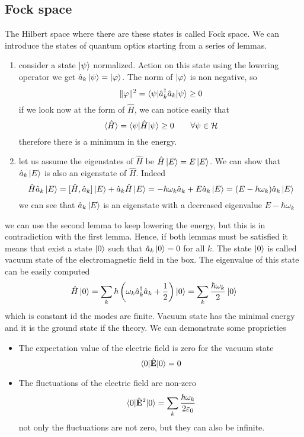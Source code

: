 \documentclass[12pt]{article}
\theoremstyle{plain}
\renewcommand{\H}{\mathcal{H}}
\theoremstyle{definition}
\theoremstyle{remark}
\begin{document}
\subsection{Fock space}
The Hilbert space where there are these states is called Fock space. We can introduce the states of quantum optics starting from a series of lemmas.
\begin{enumerate}
	\item consider a state $\ket{\psi}$ normalized. Action on this state using the lowering operator we get $\hat{a}_k \ket{\psi} = \ket{\varphi}$. The norm of $\ket{\varphi}$ is non negative, so
	\[ \|\varphi\|^2 = \braket{\psi |\hat{a}^\dagger_k \hat{a}_k|\psi}\ge 0\]
	if we look now at the form of $\hat{H}$, we can notice easily that
	\[\braket{\hat{H}} = \braket{\psi|\hat{H}|\psi} \ge 0 \qquad \forall \psi \in \H\]
	therefore there is a minimum in the energy.
	\item let us assume the eigenstates of $\hat{H}$ be $\hat{H}\ket{E} = E \ket{E}$. We can show that $\hat{a}_k\ket{E}$ is also an eigenstate of $\hat{H}$. Indeed
	\[\hat{H} \hat{a}_k \ket{E} = [\hat{H},\hat{a}_k]\ket{E} +\hat{a}_k \hat{H} \ket{E} = -\hbar \omega_k \hat{a}_k + E \hat{a}_k \ket{E} = (E-\hbar \omega_k)\hat{a}_k\ket{E}\]
	we can see that $\hat{a}_k\ket{E}$ is an eigenstate with a decreased eigenvalue $E-\hbar\omega_k$
\end{enumerate}
we can use the second lemma to keep lowering the energy, but this is in contradiction with the first lemma. Hence, if both lemmas must be satisfied it means that exist a state $\ket{0}$ such that $\hat{a}_k \ket{0} = 0$ for all $k$. The state $\ket{0}$ is called vacuum state of the electromagnetic field in the box. The eigenvalue of this state can be easily computed
\[\hat{H}\ket{0} = \sum_k \hbar \left(\omega_k\hat{a}_k^\dagger\hat{a}_k+\frac{1}{2}\right)\ket{0} = \sum_k \frac{\hbar \omega_k}{2}\ket{0}\]
which is constant id the modes are finite. Vacuum state has the minimal energy and it is the ground state if the theory. We can demonstrate some proprieties 
\begin{itemize}
	\item The expectation value of the electric field is zero for the vacuum state
	\[\braket{0|\hat{\mathbf{E}}|0} = 0\]
	\item The fluctuations of the electric field are non-zero
	\[\braket{0|\hat{\mathbf{E}}^2|0} = \sum_k \frac{\hbar \omega_k}{2\varepsilon_0}\]
	not only the fluctuations are not zero, but they can also be infinite.
\end{itemize}
\end{document}
